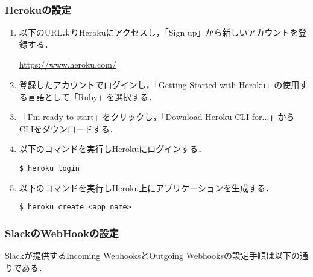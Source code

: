\documentclass[fleqn, 14pt]{extarticlej}
\begin{document}
\subsubsection{Herokuの設定}
\begin{enumerate}
\item 以下のURLよりHerokuにアクセスし，「Sign up」から新しいアカウントを登録する．

  \url{https://www.heroku.com/}
\item 登録したアカウントでログインし，「Getting Started with Heroku」の使用する言語として「Ruby」を選択する．
\item 「I’m ready to start」をクリックし，「Download Heroku CLI for...」からCLIをダウンロードする．
\item 以下のコマンドを実行しHerokuにログインする．

  \verb|$ heroku login|
\item 以下のコマンドを実行しHeroku上にアプリケーションを生成する．

  \verb|$ heroku create <app_name>|
\end{enumerate}
  
\subsubsection{SlackのWebHookの設定}
Slackが提供するIncoming WebhooksとOutgoing Webhooksの設定手順は以下の通りである．
\end{document}
